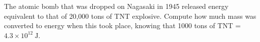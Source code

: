The atomic bomb that was dropped on Nagasaki in 1945 %
released energy equivalent to that of 20,000 tons of TNT explosive. 
Compute how much mass was converted to energy when this took place, knowing that
1000 tons of TNT = $4.3 \times 10^{12}\ \mathrm{J}$.
